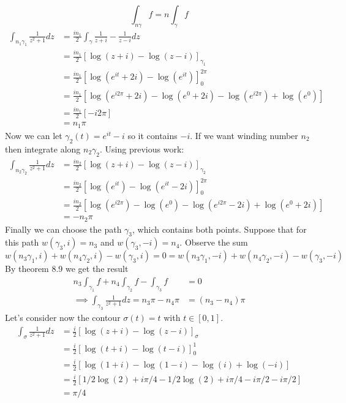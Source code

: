 \documentclass{article}
\begin{document}
\begin{enumerate}
      \[\int_{n\gamma}f=n\int_{\gamma}f\tag{$\dagger$}\]
      \begin{align*}
        \int_{n_1\gamma_1}\frac{1}{z^2+1}dz&=\frac{in_1}{2}\int_\gamma\frac{1}{z+i}-\frac{1}{z-i}dz\tag{by $\dagger$}\\
        &=\frac{in_1}{2}[\log(z+i)-\log(z-i)]_{\gamma_1}\\
        &=\frac{in_1}{2}[\log(e^{it}+2i)-\log(e^{it})]_0^{2\pi}\\
        &=\frac{in_1}{2}[\log(e^{i2\pi}+2i)-\log(e^0+2i)-\log(e^{i2\pi})+\log(e^0)]\\
        &=\frac{in_1}{2}[-i2\pi]\\
        &=n_1\pi
      \end{align*}
      Now we can let $\gamma_2(t)=e^{it}-i$ so it contains $-i$. If we want winding number $n_2$ then integrate along $n_2\gamma_2$. Using previous work:
      \begin{align*}
        \int_{n_2\gamma_2}\frac{1}{z^2+1}dz&=\frac{in_2}{2}[\log(z+i)-\log(z-i)]_{\gamma_2}\\
        &=\frac{in_2}{2}[\log(e^{it})-\log(e^{it}-2i)]_0^{2\pi}\\
        &=\frac{in_2}{2}[\log(e^{i2\pi})-\log(e^0)-\log(e^{i2\pi}-2i)+\log(e^0+2i)]\\
        &=-n_2\pi
      \end{align*}
      Finally we can choose the path $\gamma_3$, which contains both points. Suppose that for this path $w(\gamma_3,i)=n_3$ and $w(\gamma_3,-i)=n_4$. Observe the sum \[w(n_3\gamma_1,i)+w(n_4\gamma_2,i)-w(\gamma_3,i)=0=w(n_3\gamma_1,-i)+w(n_4\gamma_2,-i)-w(\gamma_3,-i)\]
      By theorem 8.9 we get the result
      \begin{align*}
        n_3\int_{\gamma_1}f+n_4\int_{\gamma_2}f-\int_{\gamma_3}f&=0\\
        \implies\int_{\gamma_3}\frac{1}{z^2+1}dz=n_3\pi-n_4\pi&=(n_3-n_4)\pi
      \end{align*}
      Let's consider now the contour $\sigma(t)=t$ with $t\in[0,1]$.
      \begin{align*}
        \int_\sigma\frac{1}{z^2+1}dz&=\frac{i}{2}[\log(z+i)-\log(z-i)]_\sigma\\
        &=\frac{i}{2}[\log(t+i)-\log(t-i)]_0^1\\
        &=\frac{i}{2}[\log(1+i)-\log(1-i)-\log(i)+\log(-i)]\\
        &=\frac{i}{2}[1/2\log(2)+i\pi/4-1/2\log(2)+i\pi/4-i\pi/2-i\pi/2]\\
        &=\pi/4

\end{align*}
\end{enumerate}
\end{document}

